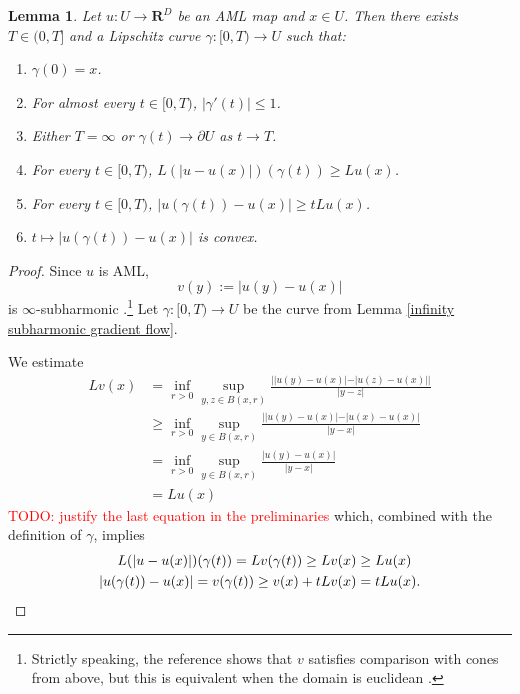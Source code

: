 \documentclass[reqno,11pt]{amsart}
\newcommand{\RR}{\mathbf{R}}
\newtheorem{lemma}[theorem]{Lemma}
\theoremstyle{definition}
\numberwithin{equation}{section}
\newcommand\todo[1]{\textcolor{red}{TODO: #1}}
\begin{document}
\begin{lemma}\label{constructing the stretch geodesic}
Let $u: U \to \RR^D$ be an AML map and $x \in U$.
Then there exists $T \in (0, T]$ and a Lipschitz curve $\gamma: [0, T) \to U$ such that:
\begin{enumerate}
\item $\gamma(0) = x$.
\item For almost every $t \in [0, T)$, $|\gamma'(t)| \leq 1$.
\item Either $T = \infty$ or $\gamma(t) \to \partial U$ as $t \to T$.
\item For every $t \in [0, T)$, $L(|u - u(x)|)(\gamma(t)) \geq Lu(x)$.
\item For every $t \in [0, T)$, $|u(\gamma(t)) - u(x)| \geq tLu(x)$.
\item $t \mapsto |u(\gamma(t)) - u(x)|$ is convex.
\end{enumerate}
\end{lemma}
\begin{proof}
Since $u$ is AML,
$$v(y) := |u(y) - u(x)|$$
is $\infty$-subharmonic \cite[Proposition 7]{Naor2012}.\footnote{Strictly speaking, the reference shows that $v$ satisfies comparison with cones from above, but this is equivalent when the domain is euclidean \cite[\S2]{Crandall2008}.}
Let $\gamma: [0, T) \to U$ be the curve from Lemma \ref{infinity subharmonic gradient flow}.

We estimate 
\begin{align*} 
Lv(x) 
&= \inf_{r > 0} \sup_{y, z \in B(x, r)} \frac{||u(y) - u(x)| - |u(z) - u(x)||}{|y - z|} \\
&\geq \inf_{r > 0} \sup_{y \in B(x, r)} \frac{||u(y) - u(x)| - |u(x) - u(x)|}{|y - x|} \\
&= \inf_{r > 0} \sup_{y \in B(x, r)} \frac{|u(y) - u(x)|}{|y - x|} \\
&= Lu(x)
\end{align*}
\todo{justify the last equation in the preliminaries} which, combined with the definition of $\gamma$, implies 
\begin{align*}
L(|u - u(x)|)(\gamma(t)) = Lv(\gamma(t)) \geq Lv(x) &\geq Lu(x) \\
|u(\gamma(t)) - u(x)| = v(\gamma(t)) \geq v(x) + tLv(x) &= tLu(x). \qedhere
\end{align*}
\end{proof}
\end{document}
